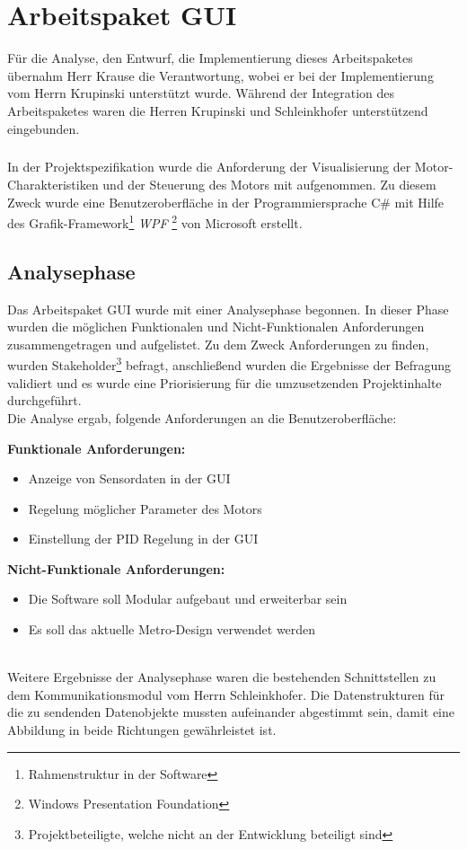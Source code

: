 \graphicspath{{./gui/Bilder/}}

\chapter{Arbeitspaket GUI}
Für die Analyse, den Entwurf, die Implementierung dieses Arbeitspaketes übernahm Herr Krause die Verantwortung, wobei er bei der Implementierung vom Herrn Krupinski unterstützt wurde. Während der Integration des Arbeitspaketes waren die Herren Krupinski und Schleinkhofer unterstützend eingebunden.
\paragraph{}
In der Projektspezifikation wurde die Anforderung der Visualisierung der Motor-Charakteristiken und der Steuerung des Motors mit aufgenommen. Zu diesem Zweck wurde eine Benutzeroberfläche in der Programmiersprache C\# mit Hilfe des Grafik-Framework\footnote{Rahmenstruktur in der Software} \textit{WPF} \footnote{Windows Presentation Foundation} von Microsoft erstellt.

\section{Analysephase}
Das Arbeitspaket GUI wurde mit einer Analysephase begonnen. In dieser Phase wurden die möglichen Funktionalen und Nicht-Funktionalen Anforderungen zusammengetragen und aufgelistet. Zu dem Zweck Anforderungen zu finden, wurden Stakeholder\footnote{Projektbeteiligte, welche nicht an der Entwicklung beteiligt sind} befragt, anschließend wurden die Ergebnisse der Befragung validiert und es wurde eine Priorisierung für die umzusetzenden Projektinhalte durchgeführt.\\
Die Analyse ergab, folgende Anforderungen an die Benutzeroberfläche:\\

\begin{minipage}[t]{0.5\textwidth}
\textbf{Funktionale Anforderungen:}
\begin{itemize}
	\item Anzeige von Sensordaten in der GUI
	\item Regelung möglicher Parameter des Motors
	\item Einstellung der PID Regelung in der GUI
	\end{itemize} 
\end{minipage}\begin{minipage}[t]{0.5\textwidth}
\textbf{Nicht-Funktionale Anforderungen:}
\begin{itemize}
	\item Die Software soll Modular aufgebaut und erweiterbar sein
	\item Es soll das aktuelle Metro-Design verwendet werden
\end{itemize} 
\end{minipage}\\
Weitere Ergebnisse der Analysephase waren die bestehenden Schnittstellen zu dem Kommunikationsmodul vom Herrn Schleinkhofer. Die Datenstrukturen für die zu sendenden Datenobjekte mussten aufeinander abgestimmt sein, damit eine Abbildung in beide Richtungen gewährleistet ist. 


